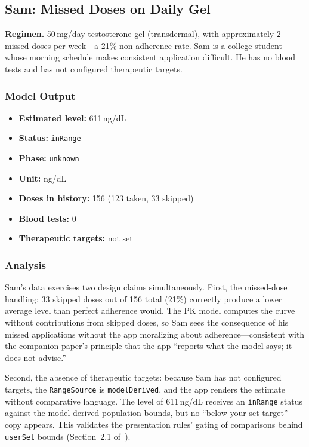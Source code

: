 \documentclass[11pt,a4paper]{article}
\newcommand{\code}[1]{\texttt{\small #1}}
\begin{document}
\subsection{Sam: Missed Doses on Daily Gel}
\label{sec:sam}

\textbf{Regimen.} 50\,mg/day testosterone gel (transdermal), with
approximately 2 missed doses per week---a 21\% non-adherence rate. Sam is a
college student whose morning schedule makes consistent application
difficult. He has no blood tests and has not configured therapeutic targets.

\subsubsection{Model Output}

\begin{itemize}[nosep,leftmargin=1.4em]
\item \textbf{Estimated level:} 611\,ng/dL
\item \textbf{Status:} \code{inRange}
\item \textbf{Phase:} \code{unknown}
\item \textbf{Unit:} ng/dL
\item \textbf{Doses in history:} 156 (123 taken, 33 skipped)
\item \textbf{Blood tests:} 0
\item \textbf{Therapeutic targets:} not set
\end{itemize}

\subsubsection{Analysis}

Sam's data exercises two design claims simultaneously. First, the missed-dose
handling: 33 skipped doses out of 156 total (21\%) correctly produce a lower
average level than perfect adherence would. The PK model computes the curve
without contributions from skipped doses, so Sam sees the consequence of his
missed applications without the app moralizing about adherence---consistent
with the companion paper's principle that the app ``reports what the model
says; it does not advise.''

Second, the absence of therapeutic targets: because Sam has not configured
targets, the \code{RangeSource} is \code{modelDerived}, and the app renders
the estimate without comparative language. The level of 611\,ng/dL receives
an \code{inRange} status against the model-derived population bounds, but no
``below your set target'' copy appears. This validates the presentation
rules' gating of comparisons behind \code{userSet} bounds
(Section~2.1 of~\cite{xtux}).
\end{document}
